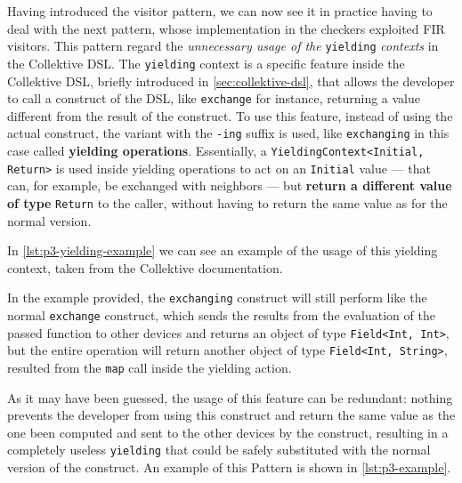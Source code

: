 \documentclass[12pt,a4paper,openright,twoside]{book}
\begin{document}
Having introduced the visitor pattern, we can now see it in practice having 
to deal with the next pattern, whose implementation in the checkers exploited
\ac{FIR} visitors. This pattern regard the \emph{unnecessary usage of the} 
\lstinline{yielding} \emph{contexts} in the Collektive DSL. 
%
The \lstinline{yielding} context is a specific feature inside the Collektive
\ac{DSL}, briefly introduced in \cref{sec:collektive-dsl}, that allows the
developer to call a construct of the \ac{DSL}, like \lstinline{exchange} for
instance, returning a value different from the result of the construct. To use
this feature, instead of using the actual construct, the variant with the
\lstinline{-ing} suffix is used, like \lstinline{exchanging} in this case
called \textbf{yielding operations}. 
%
Essentially, a \lstinline{YieldingContext<Initial, Return>} is used inside
yielding operations to act on an \lstinline{Initial} value --- that can, for
example, be exchanged with neighbors --- but \textbf{return a different value of
type} \lstinline{Return} to the caller, without having to return the same value
as for the normal version.

In \cref{lst:p3-yielding-example} we can see an example of the usage of this
yielding context, taken from the Collektive documentation. 



In the example provided, the \lstinline{exchanging} construct will still perform
like the normal \lstinline{exchange} construct, which sends the results from the
evaluation of the passed function to other devices and returns an object of type
\lstinline{Field<Int, Int>}, but the entire operation will return another object
of type \lstinline{Field<Int, String>}, resulted from the \lstinline{map} call
inside the yielding action.

As it may have been guessed, the usage of this feature can be redundant: nothing
prevents the developer from using this construct and return the same value as the
one been computed and sent to the other devices by the construct, resulting in a 
completely useless \lstinline{yielding} that could be safely substituted with the
normal version of the construct. 
%
An example of this Pattern is shown in \cref{lst:p3-example}.


\end{document}
